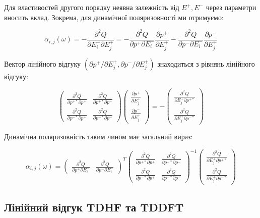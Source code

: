 \documentclass{PySCFBook}
\begin{document}
Для властивостей другого порядку неявна залежність від \(E^+, E^-\) через параметри вносить вклад. Зокрема, для динамічної поляризовності ми отримуємо:

\[\alpha_{i,j}(\omega) = -\frac{\partial^2 Q}{\partial E^-_i \partial E^+_j} = -\frac{\partial^2 Q}{\partial p^+ \partial E^-_i} \frac{\partial p^+}{\partial E^+_j} - \frac{\partial^2 Q}{\partial p^- \partial E^-_i} \frac{\partial p^-}{\partial E^+_j}\]

Вектор лінійного відгуку \((\partial p^+ / \partial E^+_j, \partial p^- / \partial E^+_j)\) знаходиться з рівнянь лінійного відгуку:

\[\begin{pmatrix} \frac{\partial^2 Q}{\partial p^{+*} \partial p^+} & \frac{\partial^2 Q}{\partial p^{+*} \partial p^-} \\ \frac{\partial^2 Q}{\partial p^{-*} \partial p^+} & \frac{\partial^2 Q}{\partial p^{-*} \partial p^-} \end{pmatrix} \begin{pmatrix} \frac{\partial p^+}{\partial E^+_j} \\ \frac{\partial p^-}{\partial E^+_j} \end{pmatrix} = - \begin{pmatrix} \frac{\partial^2 Q}{\partial E^+_j \partial p^{+*}} \\ \frac{\partial^2 Q}{\partial E^+_j \partial p^{-*}} \end{pmatrix}\]

Динамічна поляризовність таким чином має загальний вираз:

\[\alpha_{i,j}(\omega) = \begin{pmatrix} \frac{\partial^2 Q}{\partial p^+ \partial E^-_i} & \frac{\partial^2 Q}{\partial p^- \partial E^-_i} \end{pmatrix}^T \begin{pmatrix} \frac{\partial^2 Q}{\partial p^{+*} \partial p^+} & \frac{\partial^2 Q}{\partial p^{+*} \partial p^-} \\ \frac{\partial^2 Q}{\partial p^{-*} \partial p^+} & \frac{\partial^2 Q}{\partial p^{-*} \partial p^-} \end{pmatrix}^{-1} \begin{pmatrix} \frac{\partial^2 Q}{\partial E^+_j \partial p^{+*}} \\ \frac{\partial^2 Q}{\partial E^+_j \partial p^{-*}} \end{pmatrix}\]

\subsection{Лінійний відгук TDHF та TDDFT}
\end{document}
